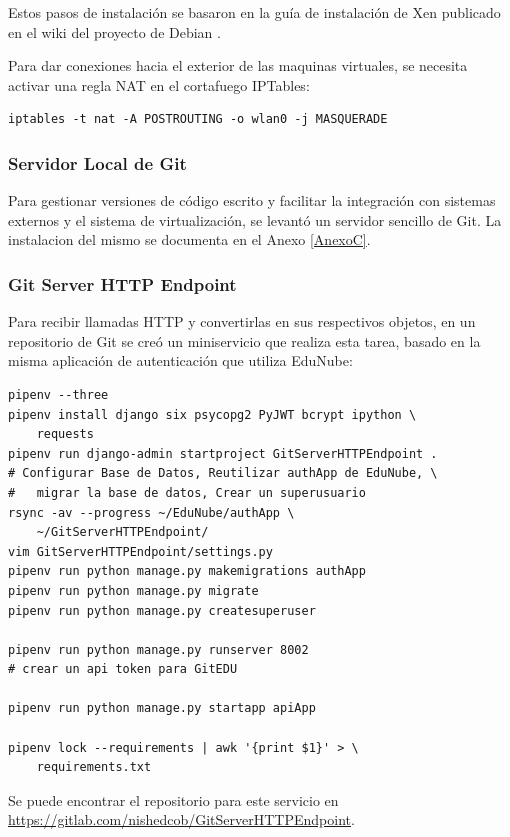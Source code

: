Estos pasos de instalación se basaron en la guía de instalación de Xen publicado en el wiki del proyecto de Debian \citep{Debian-Wiki-Xen}.

Para dar conexiones hacia el exterior de las maquinas virtuales, se necesita activar una regla NAT en el cortafuego IPTables:

\begin{lstlisting}[breaklines=true]
	iptables -t nat -A POSTROUTING -o wlan0 -j MASQUERADE
\end{lstlisting}

 
\subsubsection{Servidor Local de Git}
Para gestionar versiones de código escrito y facilitar la integración con sistemas externos y el sistema de virtualización, se levantó un servidor sencillo de Git. La instalacion del mismo se documenta en el Anexo \ref{AnexoC}.

 
\subsubsection{Git Server HTTP Endpoint}
Para recibir llamadas HTTP y convertirlas en sus respectivos objetos, en un repositorio de Git se creó un miniservicio que realiza esta tarea, basado en la misma aplicación de autenticación que utiliza EduNube:
\begin{lstlisting}
pipenv --three
pipenv install django six psycopg2 PyJWT bcrypt ipython \
	requests
pipenv run django-admin startproject GitServerHTTPEndpoint .
# Configurar Base de Datos, Reutilizar authApp de EduNube, \
#	migrar la base de datos, Crear un superusuario
rsync -av --progress ~/EduNube/authApp \
	~/GitServerHTTPEndpoint/
vim GitServerHTTPEndpoint/settings.py
pipenv run python manage.py makemigrations authApp
pipenv run python manage.py migrate
pipenv run python manage.py createsuperuser

pipenv run python manage.py runserver 8002
# crear un api token para GitEDU

pipenv run python manage.py startapp apiApp

pipenv lock --requirements | awk '{print $1}' > \
	requirements.txt
\end{lstlisting}

Se puede encontrar el repositorio para este servicio en \url{https://gitlab.com/nishedcob/GitServerHTTPEndpoint}.

